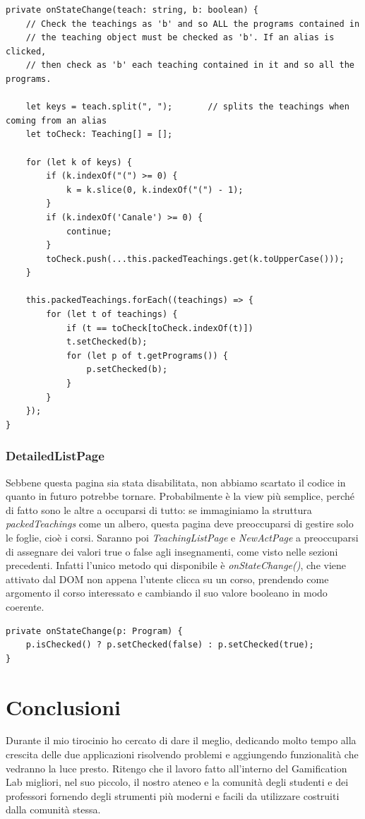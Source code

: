 \documentclass[Lau, oneside, noexaminfo]{sapthesis}%
\begin{document}
\begin{lstlisting}[frame=single]
private onStateChange(teach: string, b: boolean) {
	// Check the teachings as 'b' and so ALL the programs contained in
	// the teaching object must be checked as 'b'. If an alias is clicked,
	// then check as 'b' each teaching contained in it and so all the programs.

	let keys = teach.split(", ");		// splits the teachings when coming from an alias
	let toCheck: Teaching[] = [];

	for (let k of keys) {
		if (k.indexOf("(") >= 0) {
			k = k.slice(0, k.indexOf("(") - 1);
		}
		if (k.indexOf('Canale') >= 0) {
			continue;
		}
		toCheck.push(...this.packedTeachings.get(k.toUpperCase()));
	}
	
	this.packedTeachings.forEach((teachings) => {
		for (let t of teachings) {
			if (t == toCheck[toCheck.indexOf(t)])
			t.setChecked(b);
			for (let p of t.getPrograms()) {
				p.setChecked(b);
			}
		}
	});
}
\end{lstlisting}

\subsection{DetailedListPage}
Sebbene questa pagina sia stata disabilitata, non abbiamo scartato il codice in quanto in futuro potrebbe tornare. Probabilmente è la view più semplice, perché di fatto sono le altre a occuparsi di tutto: se immaginiamo la struttura \textit{packedTeachings} come un albero, questa pagina deve preoccuparsi di gestire solo le foglie, cioè i corsi. Saranno poi \textit{TeachingListPage} e \textit{NewActPage} a preoccuparsi di assegnare dei valori true o false agli insegnamenti, come visto nelle sezioni precedenti. Infatti l'unico metodo qui disponibile è \textit{onStateChange()}, che viene attivato dal DOM non appena l'utente clicca su un corso, prendendo come argomento il corso interessato e cambiando il suo valore booleano in modo coerente.

\begin{lstlisting}[frame=single]
private onStateChange(p: Program) {
	p.isChecked() ? p.setChecked(false) : p.setChecked(true);
}
\end{lstlisting}

\chapter{Conclusioni}
\label{ch:4}

Durante il mio tirocinio ho cercato di dare il meglio, dedicando molto tempo alla crescita delle due applicazioni risolvendo problemi e aggiungendo funzionalità che vedranno la luce presto. Ritengo che il lavoro fatto all'interno del Gamification Lab migliori, nel suo piccolo, il nostro ateneo e la comunità degli studenti e dei professori fornendo degli strumenti più moderni e facili da utilizzare costruiti dalla comunità stessa.
\end{document}
